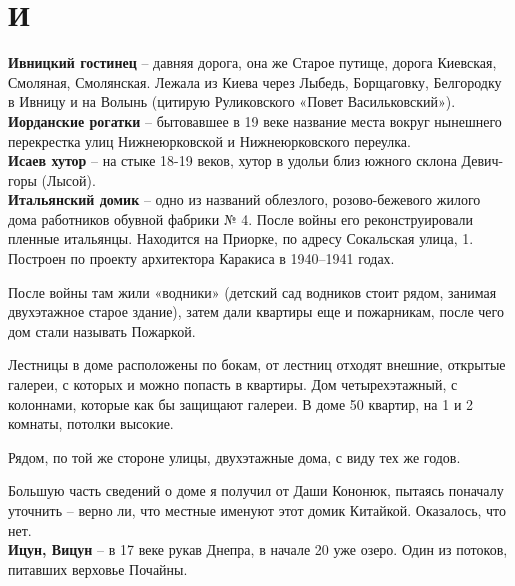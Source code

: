 \chapter*{И}


\textbf{Ивницкий гостинец} – давняя дорога, она же Старое путище, дорога Киевская, Смоляная, Смолянская. Лежала из Киева через Лыбедь, Борщаговку, Белгородку в Ивницу и на Волынь (цитирую Руликовского «Повет Васильковский»).\\ 

\textbf{Иорданские рогатки} – бытовавшее в 19 веке название места вокруг нынешнего перекрестка улиц Нижнеюрковской и Нижнеюрковского переулка.\\

\textbf{Исаев хутор} – на стыке 18-19 веков, хутор в удольи близ южного склона Девич-горы (Лысой).\\

\textbf{Итальянский домик} – одно из названий облезлого, розово-бежевого жилого дома работников обувной фабрики № 4. После войны его реконструировали пленные итальянцы. Находится на Приорке, по адресу Сокальская улица, 1. Построен по проекту архитектора Каракиса в 1940–1941 годах. 

После войны там жили «водники» (детский сад водников стоит рядом, занимая двухэтажное старое здание), затем дали квартиры еще и пожарникам, после чего дом стали называть Пожаркой.

Лестницы в доме расположены по бокам, от лестниц отходят внешние, открытые галереи, с которых и можно попасть в квартиры. Дом четырехэтажный, с колоннами, которые как бы защищают галереи. В доме 50 квартир, на 1 и 2 комнаты, потолки высокие.

Рядом, по той же стороне улицы, двухэтажные дома, с виду тех же годов.

Большую часть сведений о доме я получил от Даши Кононюк, пытаясь поначалу уточнить – верно ли, что местные именуют этот домик Китайкой. Оказалось, что нет.\\

\textbf{Ицун, Вицун} – в 17 веке рукав Днепра, в начале 20 уже озеро. Один из потоков, питавших верховье Почайны.
